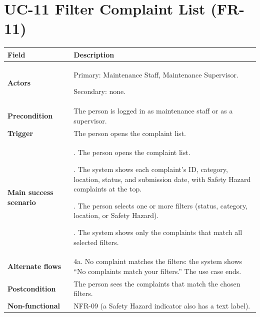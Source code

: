 \documentclass[11pt,a4paper]{report}
\begin{document}
\section{UC-11 Filter Complaint List (FR-11)}
\begin{longtable}{|>{\raggedright\arraybackslash}p{3.0cm}|>{\raggedright\arraybackslash}p{12.4cm}|}
\hline \textbf{Field} & \textbf{Description} \\ \hline \endhead
\textbf{Actors} & Primary: Maintenance Staff, Maintenance Supervisor.\par\smallskip Secondary: none. \\ \hline
\textbf{Precondition} & The person is logged in as maintenance staff or as a supervisor. \\ \hline
\textbf{Trigger} & The person opens the complaint list. \\ \hline
\textbf{Main success scenario} & 1. The person opens the complaint list.\par\smallskip 2. The system shows each complaint's ID, category, location, status, and submission date, with Safety Hazard complaints at the top.\par\smallskip 3. The person selects one or more filters (status, category, location, or Safety Hazard).\par\smallskip 4. The system shows only the complaints that match all selected filters. \\ \hline
\textbf{Alternate flows} & 4a. No complaint matches the filters: the system shows ``No complaints match your filters.'' The use case ends. \\ \hline
\textbf{Postcondition} & The person sees the complaints that match the chosen filters. \\ \hline
\textbf{Non-functional} & NFR-09 (a Safety Hazard indicator also has a text label). \\ \hline
\end{longtable}
\end{document}
